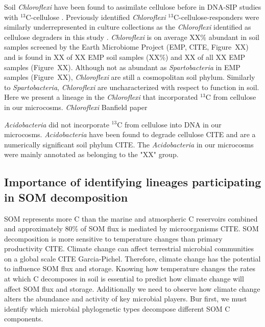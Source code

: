 Soil \textit{Chloroflexi} have been found to assimilate cellulose before in
DNA-SIP studies with $^{13}$C-cellulose \citep{Schellenberger_2010}. Previously
identified \textit{Chloroflexi} $^{13}$C-cellulose-responders were similarly
underrepresented in culture collections as the \textit{Chloroflexi} identified
as cellulose degraders in this study \citep{Schellenberger_2010}.
\textit{Chloroflexi} is on average XX\% abundant in soil samples screened by
the Earth Microbiome Project (EMP, CITE, Figure~XX) and is found in XX of XX
EMP soil samples (XX\%) and XX of all XX EMP samples (Figure~XX). Although not
as abundant as \textit{Spartobacteria} in EMP samples (Figure~XX),
\textit{Chloroflexi} are still a cosmopolitan soil phylum. Similarly to
\textit{Spartobacteria}, \textit{Chloroflexi} are uncharacterized with
respect to function in soil. Here we present a lineage in the
\textit{Chloroflexi} that incorporated $^{13}$C from cellulose in our
microcosms.  \textit{Chloroflexi} Banfield paper

\textit{Acidobacteria} did not incorporate $^{13}$C from cellulose into DNA in
our microcosms. \textit{Acidobacteria} have been found to degrade cellulose
CITE and are a numerically significant soil phylum CITE. The
\textit{Acidobacteria} in our microcosms were mainly annotated as belonging to
the "XX" group.

\subsection{Importance of identifying lineages participating in SOM
    decomposition} \label{sub:succession_with_degradation_of_labile_c}
SOM represents more C than the marine and atmospheric C reservoirs
combined and approximately 80\% of SOM flux is mediated by microorganisms
CITE. SOM decomposition is more sensitive to temperature changes than
primary productivity CITE. Climate change can affect terrestrial microbial
communities on a global scale CITE Garcia-Pichel. Therefore, climate
change has the potential to influence SOM flux and storage. Knowing how
temperature changes the rates at which C decomposes in soil is essential
to predict how climate change will affect SOM flux and storage.
Additionally we need to observe how climate change alters the abundance
and activity of key microbial players. Bur first, we must identify which
microbial phylogenetic types decompose different SOM C components.

